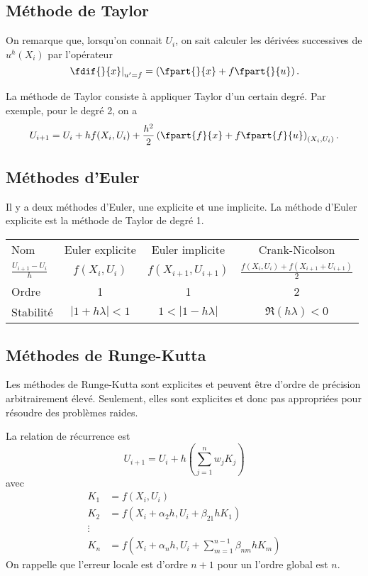 \subsection{Méthode de Taylor}
On remarque que, lorsqu'on connait $U_i$, on sait calculer les dérivées
successives de $u^h(X_i)$ par l'opérateur
\[ \left.\fdif{}{x}\right|_{u'=f} = \left(\fpart{}{x} + f\fpart{}{u}\right). \]

La méthode de Taylor consiste à appliquer Taylor d'un certain degré.
Par exemple, pour le degré 2, on a
\[ U_{i+1} = U_i + h f(X_i, U_i) +
\frac{h^2}{2}\left(\fpart{f}{x}+f\fpart{f}{u}\right)_{(X_i,U_i)}. \]

\subsection{Méthodes d'Euler}
Il y a deux méthodes d'Euler, une explicite et une implicite.
La méthode d'Euler explicite est la méthode de Taylor de degré 1.
\begin{center}
  \begin{tabular}{|l|ccc|}
    \hline
    Nom & Euler explicite & Euler implicite & Crank-Nicolson\\
    $\frac{U_{i+1}-U_i}{h}$ & $f(X_i,U_i)$ & $f(X_{i+1},U_{i+1})$
    & $\frac{f(X_i,U_i)+f(X_{i+1}+U_{i+1})}{2}$\\
    Ordre & 1 & 1 & 2\\
    Stabilité & $|1 + h\lambda| < 1$ & $1 < |1 - h\lambda|$
    & $\Re(h\lambda) < 0$\\
    \hline
  \end{tabular}
\end{center}

\subsection{Méthodes de Runge-Kutta}
Les méthodes de Runge-Kutta sont explicites et peuvent être d'ordre de
précision arbitrairement élevé.
Seulement, elles sont explicites et donc pas appropriées pour
résoudre des problèmes raides.

La relation de récurrence est
\[ U_{i+1} = U_i + h\left(\sum_{j=1}^n w_jK_j\right) \]
avec
\begin{align*}
  K_1 & = f(X_i, U_i)\\
  K_2 & = f(X_i + \alpha_2 h, U_i + \beta_{21}hK_1)\\
  \vdots\\
  K_n & = f\left(X_i + \alpha_n h, U_i + \sum_{m=1}^{n-1}\beta_{nm}hK_m\right)
\end{align*}
On rappelle que l'erreur locale est d'ordre $n+1$
pour un l'ordre global est $n$.

